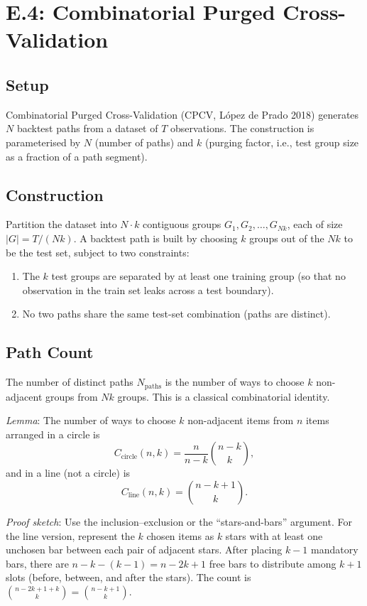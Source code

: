 \section{E.4: Combinatorial Purged Cross-Validation}

\subsection{Setup}

Combinatorial Purged Cross-Validation (CPCV, L\'opez de Prado 2018)
generates $N$ backtest paths from a dataset of $T$ observations. The
construction is parameterised by $N$ (number of paths) and $k$
(purging factor, i.e., test group size as a fraction of a path
segment).

\subsection{Construction}

Partition the dataset into $N \cdot k$ contiguous groups
$G_1, G_2, \dots, G_{Nk}$, each of size $|G| = T / (N k)$. A
backtest path is built by choosing $k$ groups out of the $Nk$ to be
the test set, subject to two constraints:
\begin{enumerate}
    \item The $k$ test groups are separated by at least one training
          group (so that no observation in the train set leaks across
          a test boundary).
    \item No two paths share the same test-set combination (paths are
          distinct).
\end{enumerate}

\subsection{Path Count}

The number of distinct paths $N_{\text{paths}}$ is the number of ways
to choose $k$ non-adjacent groups from $Nk$ groups. This is a classical
combinatorial identity.

\emph{Lemma}: The number of ways to choose $k$ non-adjacent items
from $n$ items arranged in a circle is
\[
C_{\text{circle}}(n, k) = \frac{n}{n - k} \binom{n - k}{k},
\]
and in a line (not a circle) is
\[
C_{\text{line}}(n, k) = \binom{n - k + 1}{k}.
\]

\emph{Proof sketch}: Use the inclusion--exclusion or the
``stars-and-bars'' argument. For the line version, represent the $k$
chosen items as $k$ stars with at least one unchosen bar between each
pair of adjacent stars. After placing $k - 1$ mandatory bars, there
are $n - k - (k - 1) = n - 2k + 1$ free bars to distribute among $k +
1$ slots (before, between, and after the stars). The count is
$\binom{n - 2k + 1 + k}{k} = \binom{n - k + 1}{k}$.


